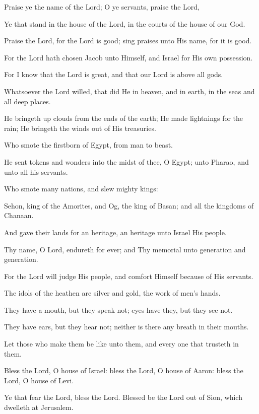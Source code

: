 Praise ye the name of the Lord; O ye servants, praise the Lord,

Ye that stand in the house of the Lord, in the courts of the house of our God.

Praise the Lord, for the Lord is good; sing praises unto His name, for it is good.

For the Lord hath chosen Jacob unto Himself, and Israel for His own possession.

For I know that the Lord is great, and that our Lord is above all gods.

Whatsoever the Lord willed, that did He in heaven, and in earth, in the seas and all deep places.

He bringeth up clouds from the ends of the earth; He made lightnings for the rain; He bringeth the winds out of His treasuries.

Who smote the firstborn of Egypt, from man to beast.

He sent tokens and wonders into the midst of thee, O Egypt; unto Pharao, and unto all his servants.

Who smote many nations, and slew mighty kings:

Sehon, king of the Amorites, and Og, the king of Basan; and all the kingdoms of Chanaan.

And gave their lands for an heritage, an heritage unto Israel His people.

Thy name, O Lord, endureth for ever; and Thy memorial unto generation and generation.

For the Lord will judge His people, and comfort Himself because of His servants.

The idols of the heathen are silver and gold, the work of men's hands.

They have a mouth, but they speak not; eyes have they, but they see not.

They have ears, but they hear not; neither is there any breath in their mouths.

Let those who make them be like unto them, and every one that trusteth in them.

Bless the Lord, O house of Israel: bless the Lord, O house of Aaron: bless the Lord, O house of Levi.

Ye that fear the Lord, bless the Lord. Blessed be the Lord out of Sion, which dwelleth at Jerusalem.
